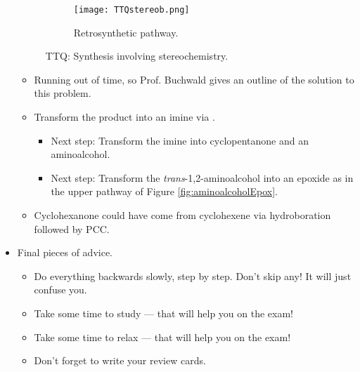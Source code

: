 \documentclass[../notes.tex]{subfiles}
\begin{document}
\begin{itemize}
\begin{figure}[h!]
        \begin{subfigure}[b]{\linewidth}
            \centering
            \texttt{[image: TTQstereob.png]}
            \caption{Retrosynthetic pathway.}
            \label{fig:TTQstereob}
        \end{subfigure}
        \caption{TTQ: Synthesis involving stereochemistry.}
        \label{fig:TTQstereo}
    \end{figure}
    \begin{itemize}
        \item Running out of time, so Prof. Buchwald gives an outline of the solution to this problem.
        \item Transform the product into an imine via .
        \begin{itemize}
            \item Next step: Transform the imine into cyclopentanone and an aminoalcohol.
            \item Next step: Transform the \emph{trans}-1,2-aminoalcohol into an epoxide as in the upper pathway of Figure \ref{fig:aminoalcoholEpox}.
        \end{itemize}
        \item Cyclohexanone could have come from cyclohexene via hydroboration followed by PCC.
    \end{itemize}
    \item Final pieces of advice.
    \begin{itemize}
        \item Do everything backwards slowly, step by step. Don't skip any! It will just confuse you.
        \item Take some time to study --- that will help you on the exam!
        \item Take some time to relax --- that will help you on the exam!
        \item Don't forget to write your review cards.
    \end{itemize}
\end{itemize}
\end{document}
